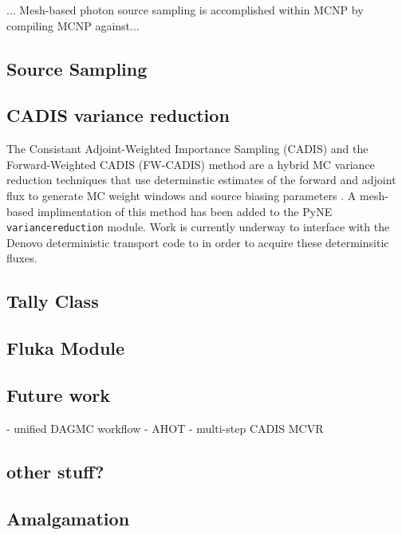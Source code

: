 \documentclass{anstrans}
\begin{document}
... Mesh-based photon source sampling is accomplished within MCNP by compiling MCNP against...


\subsection{Source Sampling}


\subsection{CADIS variance reduction}

The Consistant Adjoint-Weighted Importance Sampling (CADIS) and the
Forward-Weighted CADIS (FW-CADIS) method are a hybrid MC variance reduction
techniques that use determinstic estimates of the forward and adjoint flux to
generate MC weight windows and source biasing parameters
\cite{haghighat_monte_2003}. A mesh-based implimentation of this method has
been added to the PyNE \texttt{variancereduction} module. Work is currently
underway to interface with the Denovo \cite{Denovo} deterministic transport
code to in order to acquire these determinsitic fluxes.


\subsection{Tally Class}

\subsection{Fluka Module}

\subsection{Future work}
- unified DAGMC workflow
- AHOT
- multi-step CADIS MCVR

\subsection{other stuff?}

\subsection{Amalgamation}
\end{document}
